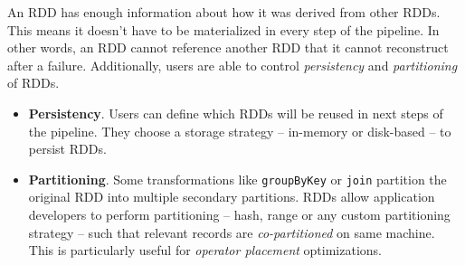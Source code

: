 An RDD has enough information about how it was derived from other RDDs. This means it doesn't have to be materialized in every step of the pipeline. In other words, an RDD cannot reference another RDD that it cannot reconstruct after a failure. Additionally, users are able to control \emph{persistency} and \emph{partitioning} of RDDs.
\begin{itemize}
    \item \textbf{Persistency}. Users can define which RDDs will be reused in next steps of the pipeline. They choose a storage strategy -- in-memory or disk-based -- to persist RDDs.
    \item \textbf{Partitioning}. Some transformations like \lstinline$groupByKey$ or \lstinline$join$ partition the original RDD into multiple secondary partitions. RDDs allow application developers to perform partitioning -- hash, range or any custom partitioning strategy -- such that relevant records are \emph{co-partitioned} on same machine. This is particularly useful for \emph{operator placement} optimizations.
\end{itemize}

